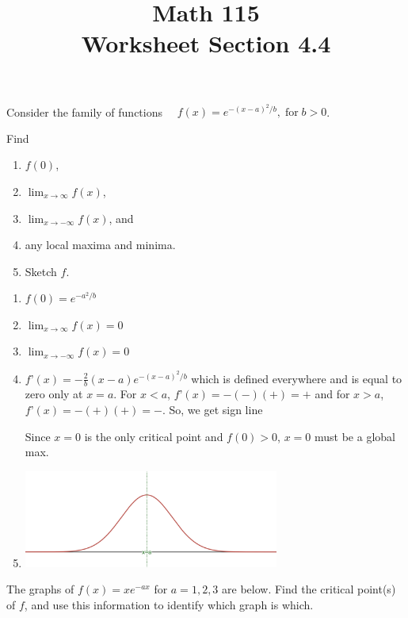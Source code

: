 \documentclass[11pt]{exam}
\title{\vspace{-0.5in} Math 115 \\ Worksheet Section 4.4}
\date{}
\begin{document}
\maketitle
\vspace{-0.75in}
\begin{questions}
  \question Consider the family of functions $\quad f(x) = e^{-(x-a)^2/b}, \; \text{for} \; b>0$.

    Find
    \begin{enumerate}
    \item \(f(0)\),
    \item $\displaystyle \lim_{x\to\infty}f(x)$,
    \item $\displaystyle \lim_{x\to-\infty} f(x)$, and
    \item any local maxima and minima.
    \item Sketch \(f\).
    \end{enumerate}
    \begin{solution}
      \begin{enumerate}
      \item \(f(0) = e^{-a^2/b}\)
      \item \(\lim_{x \to \infty} f(x) = 0\)
      \item \(\lim_{x \to -\infty} f(x) = 0\)
      \item \(f’(x) = -\frac{2}{b}(x-a) e^{-(x-a)^2/b}\) which is
        defined everywhere and is equal to zero only at \(x=a\).
        For \(x < a\), \(f’(x) = -(-)(+) = +\) and for \(x > a\),
        \(f’(x) = -(+)(+) = -\). So, we get sign line \\
Since \(x=0\) is the only critical point and \(f(0) > 0\), \(x=0\) must
be a global max.
      \item  \includegraphics[width=3.3in]{bell-curve.png}
      \end{enumerate}
    \end{solution}
    \vspace{1in}
   \question The graphs of $f(x)=xe^{-ax}$ for $a=1,2,3$ are below.  Find the critical point(s) of $f$, and use this information to identify which graph is which.


\end{questions}
\end{document}
